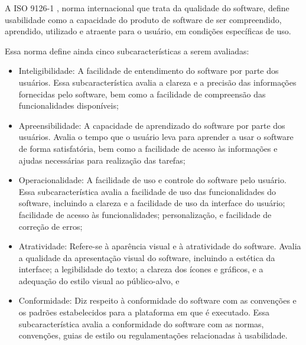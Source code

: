 A ISO 9126-1 \cite{iso9126}, norma internacional que trata da qualidade do software, 
define usabilidade como a capacidade do produto de software de ser compreendido, 
aprendido, utilizado e atraente para o usuário, em condições específicas de uso. 
\begin{description}
    \item Essa norma define ainda cinco subcaracterísticas a serem avaliadas:
          \begin{itemize}
              \item Inteligibilidade: A facilidade de entendimento do software por parte dos usuários. Essa 
              subcaracterística avalia a clareza e a precisão das informações fornecidas pelo software, bem 
              como a facilidade de compreensão das funcionalidades disponíveis;

              \item Apreensibilidade: A capacidade de aprendizado do software por parte dos usuários. Avalia 
              o tempo que o usuário leva para aprender a usar o software de forma satisfatória, bem como a 
                facilidade de acesso às informações e ajudas necessárias para realização das tarefas;

              \item Operacionalidade: A facilidade de uso e controle do software pelo usuário. Essa subcaracterística 
              avalia a facilidade de uso das funcionalidades do software, incluindo a clareza e a facilidade de uso 
              da interface do usuário; facilidade de acesso às funcionalidades; personalização, e facilidade de 
              correção de erros;

              \item Atratividade: Refere-se à aparência visual e à atratividade do software. Avalia a qualidade da 
              apresentação visual do software, incluindo a estética da interface; a legibilidade do texto; a clareza 
              dos ícones e gráficos, e a adequação do estilo visual ao público-alvo, e

              \item Conformidade: Diz respeito à conformidade do software com as convenções e os padrões estabelecidos para 
              a plataforma em que é executado. Essa subcaracterística avalia a conformidade do software com as normas, 
              convenções, guias de estilo ou regulamentações relacionadas à usabilidade.
          \end{itemize}
\end{description}



